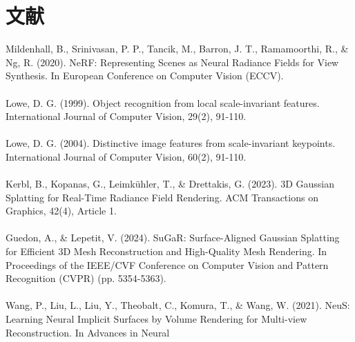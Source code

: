 \documentclass{nwputhesis}
\begin{document}
\section*{文献}
\noindent
Mildenhall, B., Srinivasan, P. P., Tancik, M., Barron, J. T., Ramamoorthi, R., \& Ng, R. (2020). NeRF: 
Representing Scenes as Neural Radiance Fields for View Synthesis. In European Conference on Computer Vision 
(ECCV).\\\\
Lowe, D. G. (1999). Object recognition from local scale-invariant features. International Journal of Computer Vision, 29(2), 91-110.\\\\
Lowe, D. G. (2004). Distinctive image features from scale-invariant keypoints. International Journal of Computer Vision, 60(2), 91-110.\\\\
Kerbl, B., Kopanas, G., Leimkühler, T., \& Drettakis, G. (2023). 3D Gaussian Splatting for Real-Time Radiance Field Rendering. ACM Transactions on Graphics, 42(4), Article 1. \\\\
Guedon, A., \& Lepetit, V. (2024). SuGaR: Surface-Aligned Gaussian Splatting for Efficient 3D Mesh Reconstruction and High-Quality Mesh Rendering. In Proceedings of the IEEE/CVF Conference on Computer Vision and Pattern Recognition (CVPR) (pp. 5354-5363). \\\\
Wang, P., Liu, L., Liu, Y., Theobalt, C., Komura, T., \& Wang, W. (2021). NeuS: Learning Neural Implicit Surfaces by Volume Rendering for Multi-view Reconstruction. In Advances in Neural \\\\
\end{document}
